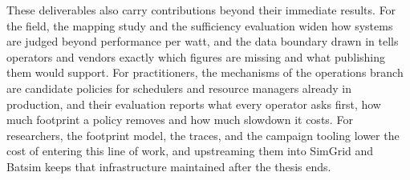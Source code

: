 These deliverables also carry contributions beyond their immediate results. For the field, the mapping study and the sufficiency evaluation widen how systems are judged beyond performance per watt, and the data boundary drawn in  tells operators and vendors exactly which figures are missing and what publishing them would support. For practitioners, the mechanisms of the operations branch are candidate policies for schedulers and resource managers already in production, and their evaluation reports what every operator asks first, how much footprint a policy removes and how much slowdown it costs. For researchers, the footprint model, the traces, and the campaign tooling lower the cost of entering this line of work, and upstreaming them into SimGrid and Batsim keeps that infrastructure maintained after the thesis ends.
